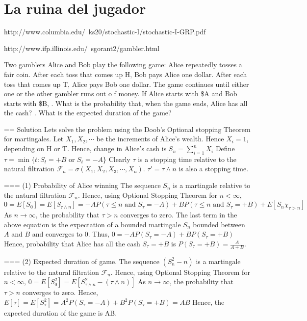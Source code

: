 \chapter{La ruina del jugador}\label{chap:manual}

http://www.columbia.edu/~ks20/stochastic-I/stochastic-I-GRP.pdf


http://www.ifp.illinois.edu/~sgorant2/gambler.html


Two gamblers Alice and Bob play the following game: Alice repeatedly tosses a fair coin. 
After each toss that comes up H, Bob pays Alice one dollar. After each toss that comes up T, 
Alice pays Bob one dollar. The game continues until either one or the other gambler runs out o
f money. If Alice starts with \$A and Bob starts with \$B,
. What is the probability that, when the game ends, Alice has all the cash?
. What is the expected duration of the game?
 
== Solution
Lets solve the problem using the Doob's Optional stopping Theorem for martingales.
Let $X_1,X_2,\cdots$ be the increments of Alice's wealth. Hence $X_i= 1$, depending on H or T. 
Hence, change in Alice's cash is
\( 
S_n = \sum_{i=1}^n X_i 
\)
Define  
\(
\tau = \min\{t: S_t = +B \mbox{ or } S_t = -A \}
\)
Clearly $\tau$ is a stopping time relative to the natural filtration
$\mathcal{F}_n = \sigma(X_1,X_2,X_3,\cdots,X_n)$. 
$\tau' = \tau \wedge n$ is also a stopping time.

=== (1) Probability of Alice winning
The sequence $S_n$ is a martingale relative to the natural filtration $\mathcal{F}_n$. 
Hence, using Optional Stopping Theorem for $n < \infty$,
\( 
 0 = {E}[S_0] = {E}[S_{\tau \wedge n}] = -A P(\tau \leq n \mbox{ and } S_{\tau} = -A) + B P(\tau \leq n \mbox{ and } S_{\tau} = +B) + E[S_n \chi_{\tau > n}]
 \)                                               
 As $n \to \infty$, the probability that  $\tau > n$ converges to zero. 
 The last term in the above equation is the expectation of a bounded martingale $S_n$
 bounded between $A$ and $B$ and converges to 0. Thus,
 \(
  0 = - A P(S_{\tau} = -A) + B P(S_{\tau} = +B) 
 \)
 Hence, probability that Alice has all the cash $S_{\tau} = +B$ is
 \(
 P(S_{\tau} = +B) = \frac{A}{A+B}.
 \)
 
=== (2) Expected duration of game.
The sequence $(S_n^2-n)$ is a martingale relative to the natural filtration $\mathcal{F}_n$.
Hence, using Optional Stopping Theorem for $n < \infty$,
\( 
 0 = {E}[S^2_0] = {E}[S_{\tau \wedge n}^2 - (\tau \wedge n)]
 \)                                                                                                          
 As $n \to \infty$, the probability that  $\tau > n$ converges to zero. 
Hence,
\(
E[\tau] = E[S_{\tau}^2] = A^2  P(S_{\tau} = -A) + B^2  P(S_{\tau} = +B) = AB 
\)                               
Hence, the expected duration of the game is AB.